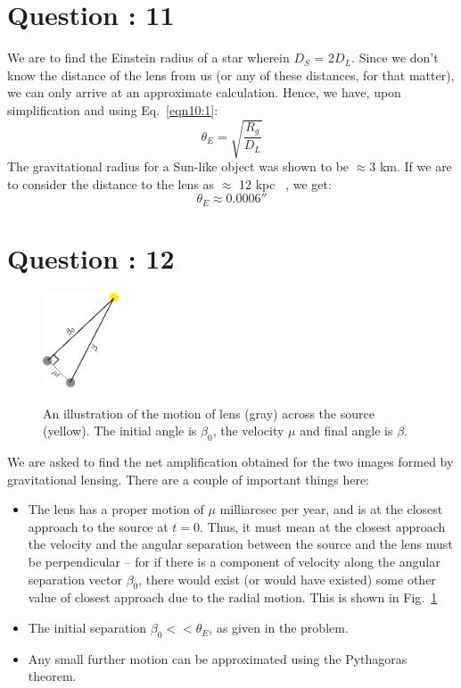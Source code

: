 \documentclass{article}
\begin{document}
\section{Question : 11}
We are to find the Einstein radius of a star wherein $D_S$ = 2$D_L$. Since we don't know the distance of the lens from us (or any of these distances, for that matter), we can only arrive at an approximate calculation. Hence,
we have, upon simplification and using Eq.~\ref{eqn10:1}:
\begin{equation}
\theta_E = \sqrt{\frac{R_g}{D_L}} 
\end{equation}
The gravitational radius for a Sun-like object was shown to be $\approx$3 km. If we are to consider the distance to the lens as $\approx$ 12 kpc ~\cite{christie2006detecting}, we get:
$$
\theta_E \approx 0.0006''
$$
\section{Question : 12}
\begin{figure}[!htpb]
\begin{center}
\includegraphics[width=0.2\textwidth]{A_1_12.eps}
\label{fig:12_1}
\caption{An illustration of the motion of lens (gray) across the source (yellow). The initial angle is $\beta_0$, the velocity $\mu$ and final angle is $\beta$.}
\label{fig:amp}
\end{center}
\end{figure}
We are asked to find the net amplification obtained for the two images formed by gravitational lensing. There are a couple of important things here:
\begin{itemize}
\item The lens has a proper motion of $\mu$ milliarcsec per year, and is at the closest approach to the source at $t=0$. Thus, it must mean at the closest approach the velocity and the angular separation between the source and the lens must be perpendicular --  for if there is a component of velocity along the angular separation vector $\beta_0$, there would exist (or would have existed) some other value of closest approach due to the radial motion. This is shown in Fig.~\ref{fig:amp}
\item The initial separation $\beta_0<<\theta_E$, as given in the problem.
\item Any small further motion can be approximated using the Pythagoras theorem.
\end{itemize}
\end{document}
